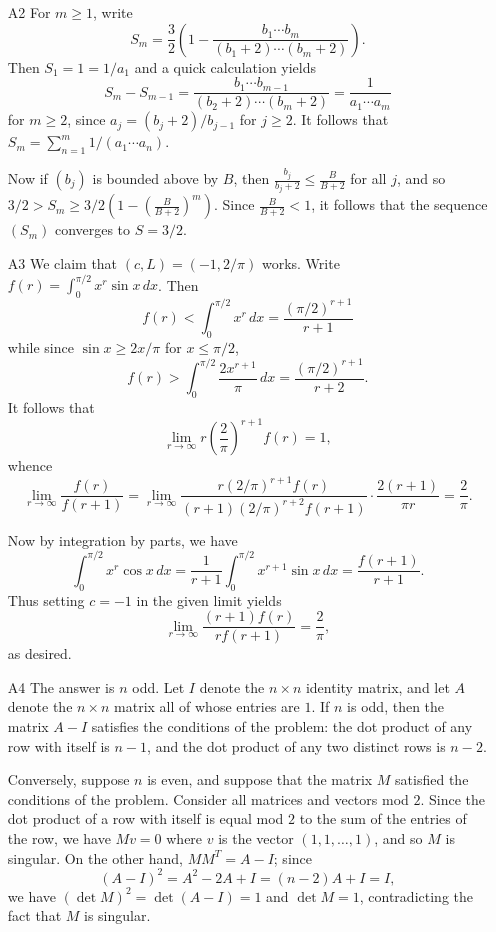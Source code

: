\documentclass[amssymb,twocolumn,pra,10pt,aps]{revtex4-1}
\begin{document}
\begin{itemize}
\item[A2]
For $m\geq 1$, write
\[
S_m = \frac{3}{2}\left(1 - \frac{b_1\cdots b_m}{(b_1+2)\cdots(b_m+2)}\right).
 \]
Then $S_1 = 1 = 1/a_1$ and a quick calculation yields
\[
S_m-S_{m-1} = \frac{b_1\cdots b_{m-1}}{(b_2+2)\cdots(b_m+2)} = \frac{1}{a_1\cdots a_m}
\]
for $m\geq 2$, since $a_j = (b_j+2)/b_{j-1}$ for $j \geq 2$. It follows
that $S_m = \sum_{n=1}^m 1/(a_1\cdots a_n)$.

Now if $(b_j)$ is bounded above by $B$, then $\frac{b_j}{b_j+2}
\leq \frac{B}{B+2}$ for all $j$, and so $3/2 > S_m \geq
3/2(1-(\frac{B}{B+2})^m)$. Since $\frac{B}{B+2} < 1$, it follows that the
sequence $(S_m)$ converges to $S = 3/2$.

\item[A3]
We claim that $(c,L) = (-1,2/\pi)$ works.
Write $f(r) = \int_0^{\pi/2} x^r\sin x\,dx$. Then
\[
f(r)  < \int_0^{\pi/2} x^r\,dx = \frac{(\pi/2)^{r+1}}{r+1}
\]
while since $\sin x \geq 2x/\pi$ for $x \leq \pi/2$,
\[
f(r) > \int_0^{\pi/2} \frac{2x^{r+1}}{\pi} \,dx = \frac{(\pi/2)^{r+1}}{r+2}.
\]
It follows that
\[
\lim_{r\to\infty} r \left(\frac{2}{\pi}\right)^{r+1} f(r) = 1,
\]
whence
\[
\lim_{r\to\infty} \frac{f(r)}{f(r+1)} = \lim_{r\to\infty}
\frac{r(2/\pi)^{r+1}f(r)}{(r+1)(2/\pi)^{r+2}f(r+1)} \cdot
\frac{2(r+1)}{\pi r} = \frac{2}{\pi}.
\]

Now by integration by parts, we have
\[
\int_0^{\pi/2} x^r\cos x\,dx = \frac{1}{r+1} \int_0^{\pi/2} x^{r+1} \sin x\,dx
    = \frac{f(r+1)}{r+1}.
\]
Thus setting $c = -1$ in the given limit yields
\[
\lim_{r\to\infty} \frac{(r+1)f(r)}{r f(r+1)} =
\frac{2}{\pi},
\]
as desired.

\item[A4] The answer is $n$ odd. Let $I$ denote the $n\times n$ identity
matrix, and let $A$ denote the $n\times n$ matrix all of whose entries
are $1$. If $n$ is odd, then the matrix $A-I$ satisfies the conditions of
the problem: the dot product of any row with itself is $n-1$, and the dot
product of any two distinct rows is $n-2$.

Conversely, suppose $n$ is even, and suppose that the matrix $M$ satisfied
the conditions of the problem. Consider all matrices and vectors mod
$2$. Since the dot product of a row with itself is equal mod $2$ to the
sum of the entries of the row, we have $M v = 0$ where $v$ is the vector
$(1,1,\ldots,1)$, and so $M$ is singular. On the other hand, $M M^T =
A-I$; since
\[
(A-I)^2 = A^2-2A+I = (n-2)A+I = I,
\]
we have $(\det M)^2 = \det(A-I) = 1$ and $\det M = 1$, contradicting the
fact that $M$ is singular.


\end{itemize}
\end{document}
